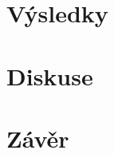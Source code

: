 \documentclass[a4paper,12pt]{article}   %
\numberwithin{equation}{section}        %
\begin{document}
	\section{Výsledky}
	
	\clearpage
	
	\section{Diskuse}
	
	\clearpage
	
	\section{Závěr}
	
	\clearpage

    \clearpage	
    \renewcommand{\refname}{Seznam použité literatury} 	%
    \printbibliography
    \clearpage

    
    
\end{document}
